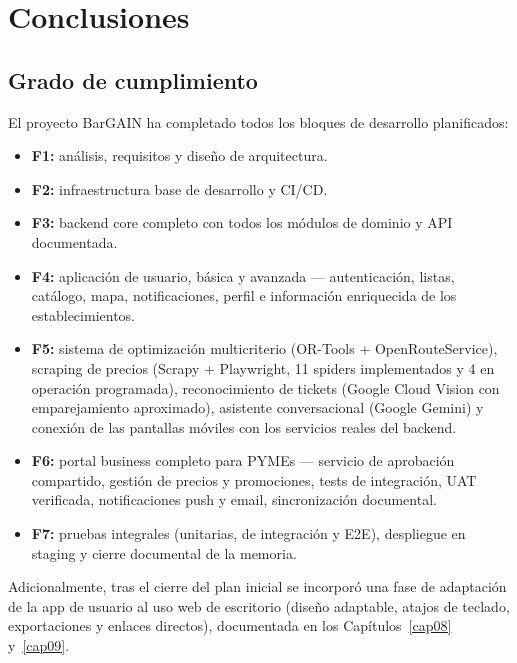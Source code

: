 
\chapter{Conclusiones}\label{cap11}

\section{Grado de cumplimiento}\label{sec:cumplimiento}

El proyecto BarGAIN ha completado todos los bloques de desarrollo planificados:

\begin{itemize}
  \item \textbf{F1:} an\'alisis, requisitos y dise\~no de arquitectura.
  \item \textbf{F2:} infraestructura base de desarrollo y CI/CD.
  \item \textbf{F3:} backend core completo con todos los m\'odulos de dominio y API documentada.
  \item \textbf{F4:} aplicaci\'on de usuario, b\'asica y avanzada --- autenticaci\'on, listas,
    cat\'alogo, mapa, notificaciones, perfil e informaci\'on enriquecida de los establecimientos.
  \item \textbf{F5:} sistema de optimizaci\'on multicriterio (OR-Tools + OpenRouteService),
    scraping de precios (Scrapy + Playwright, 11 spiders implementados y 4 en operaci\'on
    programada), reconocimiento de tickets (Google Cloud Vision con emparejamiento aproximado),
    asistente conversacional (Google Gemini) y conexi\'on de las pantallas m\'oviles con los
    servicios reales del backend.
  \item \textbf{F6:} portal business completo para PYMEs --- servicio de aprobaci\'on compartido,
    gesti\'on de precios y promociones, tests de integraci\'on, UAT verificada, notificaciones push
    y email, sincronizaci\'on documental.
  \item \textbf{F7:} pruebas integrales (unitarias, de integraci\'on y E2E), despliegue en
    staging y cierre documental de la memoria.
\end{itemize}

Adicionalmente, tras el cierre del plan inicial se incorpor\'o una fase de adaptaci\'on de la app
de usuario al uso web de escritorio (dise\~no adaptable, atajos de teclado, exportaciones y
enlaces directos), documentada en los Cap\'itulos~\ref{cap08} y~\ref{cap09}.

